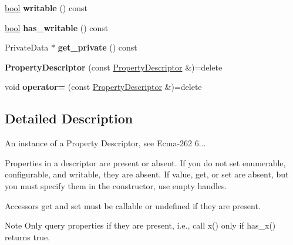 \begin{DoxyCompactItemize}
\item 
\mbox{\label{classv8_1_1PropertyDescriptor_a549aa06b69cf4d3c4ef54af7cd06462c}} 
\mbox{\hyperlink{classbool}{bool}} {\bfseries writable} () const
\item 
\mbox{\label{classv8_1_1PropertyDescriptor_a3d348233abc24c49daf8770e714e39e1}} 
\mbox{\hyperlink{classbool}{bool}} {\bfseries has\+\_\+writable} () const
\item 
\mbox{\label{classv8_1_1PropertyDescriptor_aea136ecc07fdc9483e007f4bc4c45e3e}} 
Private\+Data $\ast$ {\bfseries get\+\_\+private} () const
\item 
\mbox{\label{classv8_1_1PropertyDescriptor_ab06b5924a188d744797c44952d154fce}} 
{\bfseries Property\+Descriptor} (const \mbox{\hyperlink{classv8_1_1PropertyDescriptor}{Property\+Descriptor}} \&)=delete
\item 
\mbox{\label{classv8_1_1PropertyDescriptor_a924fcc63be20f822bdaacdd7bc967805}} 
void {\bfseries operator=} (const \mbox{\hyperlink{classv8_1_1PropertyDescriptor}{Property\+Descriptor}} \&)=delete
\end{DoxyCompactItemize}


\subsection{Detailed Description}
An instance of a Property Descriptor, see Ecma-\/262 6...

Properties in a descriptor are present or absent. If you do not set {\ttfamily enumerable}, {\ttfamily configurable}, and {\ttfamily writable}, they are absent. If {\ttfamily value}, {\ttfamily get}, or {\ttfamily set} are absent, but you must specify them in the constructor, use empty handles.

Accessors {\ttfamily get} and {\ttfamily set} must be callable or undefined if they are present.

\begin{DoxyNote}{Note}
Only query properties if they are present, i.\+e., call {\ttfamily x()} only if {\ttfamily has\+\_\+x()} returns true.
\end{DoxyNote}

